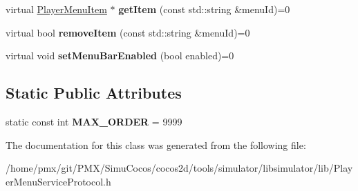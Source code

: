 \begin{DoxyCompactItemize}
\item 
\mbox{\label{classPlayerMenuServiceProtocol_aeabe33a0b1126f90cac7823f1ec8365c}} 
virtual \hyperlink{classPlayerMenuItem}{Player\+Menu\+Item} $\ast$ {\bfseries get\+Item} (const std\+::string \&menu\+Id)=0
\item 
\mbox{\label{classPlayerMenuServiceProtocol_a1cb1e53ad68acb448232673dd6a2940d}} 
virtual bool {\bfseries remove\+Item} (const std\+::string \&menu\+Id)=0
\item 
\mbox{\label{classPlayerMenuServiceProtocol_ab8b780c9a0d80aaf622808f0a67c9c42}} 
virtual void {\bfseries set\+Menu\+Bar\+Enabled} (bool enabled)=0
\end{DoxyCompactItemize}
\subsection*{Static Public Attributes}
\begin{DoxyCompactItemize}
\item 
\mbox{\label{classPlayerMenuServiceProtocol_aa1911cbe21ac8153d5075a4da990afcf}} 
static const int {\bfseries M\+A\+X\+\_\+\+O\+R\+D\+ER} = 9999
\end{DoxyCompactItemize}


The documentation for this class was generated from the following file\+:\begin{DoxyCompactItemize}
\item 
/home/pmx/git/\+P\+M\+X/\+Simu\+Cocos/cocos2d/tools/simulator/libsimulator/lib/Player\+Menu\+Service\+Protocol.\+h\end{DoxyCompactItemize}
